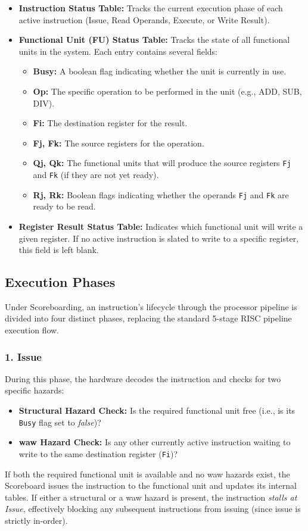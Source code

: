 \begin{itemize}
    \item \textbf{Instruction Status Table:} Tracks the current execution phase of each active instruction (Issue, Read Operands, Execute, or Write Result).
    \item \textbf{Functional Unit (FU) Status Table:} Tracks the state of all functional units in the system. Each entry contains several fields:
    \begin{itemize}
        \item \textbf{Busy:} A boolean flag indicating whether the unit is currently in use.
        \item \textbf{Op:} The specific operation to be performed in the unit (e.g., ADD, SUB, DIV).
        \item \textbf{Fi:} The destination register for the result.
        \item \textbf{Fj, Fk:} The source registers for the operation.
        \item \textbf{Qj, Qk:} The functional units that will produce the source registers \texttt{Fj} and \texttt{Fk} (if they are not yet ready).
        \item \textbf{Rj, Rk:} Boolean flags indicating whether the operands \texttt{Fj} and \texttt{Fk} are ready to be read.
    \end{itemize}
    \item \textbf{Register Result Status Table:} Indicates which functional unit will write a given register. If no active instruction is slated to write to a specific register, this field is left blank.
\end{itemize}

\subsection{Execution Phases}

Under Scoreboarding, an instruction's lifecycle through the processor pipeline is divided into four distinct phases, replacing the standard 5-stage RISC pipeline execution flow.

\subsubsection{1. Issue}
During this phase, the hardware decodes the instruction and checks for two specific hazards:
\begin{itemize}
    \item \textbf{Structural Hazard Check:} Is the required functional unit free (i.e., is its \texttt{Busy} flag set to \textit{false})?
    \item \textbf{\gls{waw} Hazard Check:} Is any other currently active instruction waiting to write to the same destination register (\texttt{Fi})? 
\end{itemize}
If both the required functional unit is available and no \gls{waw} hazards exist, the Scoreboard issues the instruction to the functional unit and updates its internal tables. If either a structural or a \gls{waw} hazard is present, the instruction \textit{stalls at Issue}, effectively blocking any subsequent instructions from issuing (since issue is strictly in-order).

